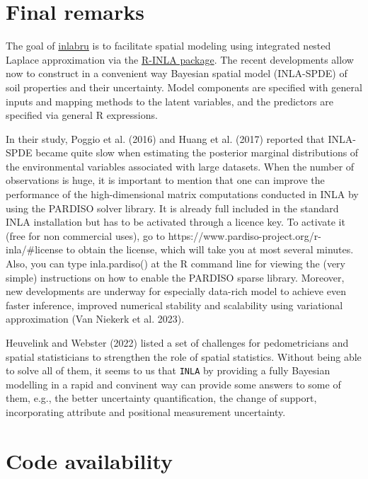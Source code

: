 \documentclass[
  a4paper,
]{article}
\begin{document}
\hypertarget{final-remarks}{%
\section{Final remarks}\label{final-remarks}}

The goal of \href{http://inlabru.org/}{inlabru} is to facilitate spatial
modeling using integrated nested Laplace approximation via the
\href{https://www.r-inla.org/}{R-INLA package}. The recent developments
allow now to construct in a convenient way Bayesian spatial model
(INLA-SPDE) of soil properties and their uncertainty. Model components
are specified with general inputs and mapping methods to the latent
variables, and the predictors are specified via general R expressions.

In their study, Poggio et al. (2016) and Huang et al. (2017) reported
that INLA-SPDE became quite slow when estimating the posterior marginal
distributions of the environmental variables associated with large
datasets. When the number of observations is huge, it is important to
mention that one can improve the performance of the high-dimensional
matrix computations conducted in INLA by using the PARDISO solver
library. It is already full included in the standard INLA installation
but has to be activated through a licence key. To activate it (free for
non commercial uses), go to
https://www.pardiso-project.org/r-inla/\#license to obtain the license,
which will take you at most several minutes. Also, you can type
inla.pardiso() at the R command line for viewing the (very simple)
instructions on how to enable the PARDISO sparse library. Moreover, new
developments are underway for especially data-rich model to achieve even
faster inference, improved numerical stability and scalability using
variational approximation (Van Niekerk et al. 2023).

Heuvelink and Webster (2022) listed a set of challenges for
pedometricians and spatial statisticians to strengthen the role of
spatial statistics. Without being able to solve all of them, it seems to
us that \texttt{INLA} by providing a fully Bayesian modelling in a rapid
and convinent way can provide some answers to some of them, e.g., the
better uncertainty quantification, the change of support, incorporating
attribute and positional measurement uncertainty.

\hypertarget{code-availability}{%
\section{Code availability}\label{code-availability}}
\end{document}
